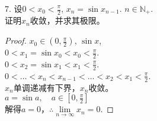 7. 设$ 0<x_0<\frac{\pi}{2} $, $ x_n = \sin {x_{n-1}} $. $ n\in\mathbb{N}_+ $.\\
证明{$ x_n $}收敛，并求其极限。
\begin{proof}
	
	$ x_0\in(0,\frac{\pi}{2}) $, $ \sin{x} $,\\
	$ 0<x_1 = \sin{x_0}<x_0<\frac{\pi}{2} $.\\
	$ 0<x_2=\sin{x_1}<x_1<\frac{\pi}{2} $.\\
	$ 0<\dots<x_n<x_{n-1}<\dots<x_2<x_1<\frac{\pi}{2} $.\\
	{$ x_n $}单调递减有下界，{$ x_n $}收敛。\\
	$ a = \sin{a}, \quad a\in[0,\frac{\pi}{2}] $\\
	解得$ a=0 $，$ \therefore \lim\limits_{n\rightarrow\infty} x_n = 0 $.
\end{proof}